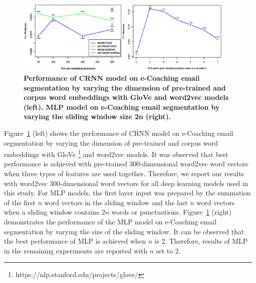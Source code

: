 \documentclass{amia}
\begin{document}
\begin{figure}[!htb]
    \centering
    \includegraphics[width=0.95\textwidth]{figures/mlp-and-vector.eps}
    \caption{\textbf{Performance of CRNN model on e-Coaching email segmentation by varying the dimension of pre-trained and corpus word embeddings with GloVe and word2vec models (left). MLP model on e-Coaching email segmentation by varying the sliding window size 2n (right).}}
    \label{fig:embedding-dimension-mlp}
\end{figure}   

Figure~\ref{fig:embedding-dimension-mlp} (left) shows the performance of CRNN model on e-Coaching email segmentation by varying the dimension of pre-trained and corpus word embeddings with GloVe \footnote{https://nlp.stanford.edu/projects/glove/} and word2vec models. It was observed that best performance is achieved with pre-trained 300-dimensional word2vec word vectors when three types of features are used together. Therefore, we report our results with word2vec 300-dimensional word vectors for all deep learning models used in this study. For MLP models, the first layer input was prepared by the summation of the first $n$ word vectors in the sliding window and the last $n$ word vectors when a sliding window contains $2n$ words or punctuations. Figure~\ref{fig:embedding-dimension-mlp} (right) demonstrates the performance of the MLP model on e-Coaching email segmentation by varying the size of the sliding window. It can be observed that the best performance of MLP is achieved when $n$ is 2. Therefore, results of MLP in the remaining experiments are reported with $n$ set to 2. 
\end{document}
